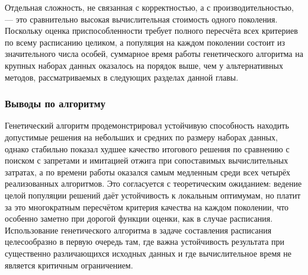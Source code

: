 Отдельная сложность, не связанная с корректностью, а с производительностью, — это сравнительно высокая вычислительная стоимость одного поколения. Поскольку оценка приспособленности требует полного пересчёта всех критериев по всему расписанию целиком, а популяция на каждом поколении состоит из значительного числа особей, суммарное время работы генетического алгоритма на крупных наборах данных оказалось на порядок выше, чем у альтернативных методов, рассматриваемых в следующих разделах данной главы.

\subsubsection {Выводы по алгоритму}

Генетический алгоритм продемонстрировал устойчивую способность находить допустимые решения на небольших и средних по размеру наборах данных, однако стабильно показал худшее качество итогового решения по сравнению с поиском с запретами и имитацией отжига при сопоставимых вычислительных затратах, а по времени работы оказался самым медленным среди всех четырёх реализованных алгоритмов. Это согласуется с теоретическим ожиданием: ведение целой популяции решений даёт устойчивость к локальным оптимумам, но платит за это многократным пересчётом критерия качества на каждом поколении, что особенно заметно при дорогой функции оценки, как в случае расписания. Использование генетического алгоритма в задаче составления расписания целесообразно в первую очередь там, где важна устойчивость результата при существенно различающихся исходных данных и где вычислительное время не является критичным ограничением.
